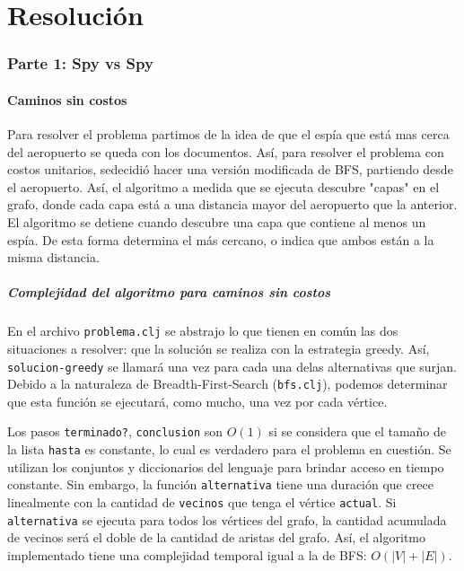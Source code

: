 \documentclass{article}
\begin{document}
\part{Resolución}
\section{Parte 1: Spy vs Spy}

\subsection{Caminos sin costos}
Para resolver el problema partimos de la idea de que el espía que está mas cerca del aeropuerto se queda con los documentos. Así, para resolver el problema con costos unitarios, sedecidió hacer una versión modificada de BFS, partiendo desde el aeropuerto. Así, el algoritmo a medida que se ejecuta descubre "capas" en el grafo, donde cada capa está a una distancia mayor del aeropuerto que la anterior. El algoritmo se detiene cuando descubre una capa que contiene al menos un espía. De esta forma determina el más cercano, o indica que ambos están a la misma distancia.

\subsubsection{Complejidad del algoritmo para caminos sin costos}

En el archivo \texttt{problema.clj} se abstrajo lo que tienen en común las dos situaciones a resolver: que la solución se realiza con la estrategia greedy. Así, \texttt{solucion-greedy} se llamará una vez para cada una delas alternativas que surjan. Debido a la naturaleza de Breadth-First-Search (\texttt{bfs.clj}), podemos determinar que esta función se ejecutará, como mucho, una vez por cada vértice.

Los pasos \texttt{terminado?}, \texttt{conclusion} son $O(1)$ si se considera que el tamaño de la lista \texttt{hasta} es constante, lo cual es verdadero para el problema en cuestión. Se utilizan los conjuntos y diccionarios del lenguaje para brindar acceso en tiempo constante. Sin embargo, la función \texttt{alternativa} tiene una duración que crece linealmente con la cantidad de \texttt{vecinos} que tenga el vértice \texttt{actual}. Si \texttt{alternativa} se ejecuta para todos los vértices del grafo, la cantidad acumulada de vecinos será el doble de la cantidad de aristas del grafo. Así, el algoritmo implementado tiene una complejidad temporal igual a la de BFS: $O(|V|+|E|)$.
\end{document}
